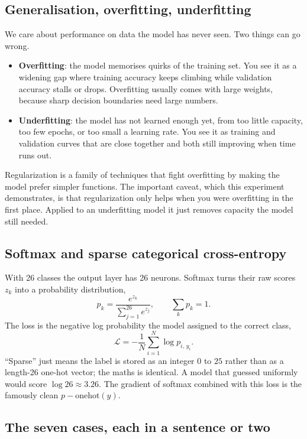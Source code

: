 \documentclass[12pt]{article}
\begin{document}
\subsection{Generalisation, overfitting, underfitting}

We care about performance on data the model has never seen. Two things can go
wrong.

\begin{itemize}
\item \textbf{Overfitting}: the model memorises quirks of the training set. You
      see it as a widening gap where training accuracy keeps climbing while
      validation accuracy stalls or drops. Overfitting usually comes with large
      weights, because sharp decision boundaries need large numbers.
\item \textbf{Underfitting}: the model has not learned enough yet, from too
      little capacity, too few epochs, or too small a learning rate. You see it
      as training and validation curves that are close together and both still
      improving when time runs out.
\end{itemize}

Regularization is a family of techniques that fight overfitting by making the
model prefer simpler functions. The important caveat, which this experiment
demonstrates, is that regularization only helps when you were overfitting in
the first place. Applied to an underfitting model it just removes capacity the
model still needed.

\subsection{Softmax and sparse categorical cross-entropy}

With 26 classes the output layer has 26 neurons. Softmax turns their raw scores
$z_k$ into a probability distribution,
\[
  p_k = \frac{e^{z_k}}{\sum_{j=1}^{26} e^{z_j}},
  \qquad \sum_k p_k = 1 .
\]
The loss is the negative log probability the model assigned to the correct
class,
\[
  \mathcal{L} = -\frac{1}{N}\sum_{i=1}^{N} \log p_{i,\,y_i} .
\]
``Sparse'' just means the label is stored as an integer $0$ to $25$ rather than
as a length-26 one-hot vector; the maths is identical. A model that guessed
uniformly would score $\log 26 \approx 3.26$. The gradient of softmax combined
with this loss is the famously clean $p - \text{onehot}(y)$.

\subsection{The seven cases, each in a sentence or two}
\end{document}
